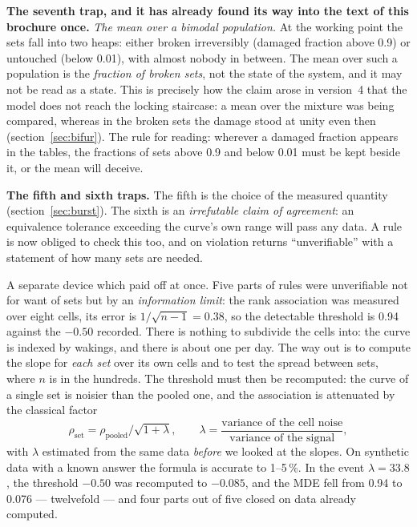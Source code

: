 \textbf{The seventh trap, and it has already found its way into the text of this brochure once.} \emph{The mean over a bimodal population.} At the working point the sets fall into two heaps: either broken irreversibly (damaged fraction above 0.9) or untouched (below 0.01), with almost nobody in between. The mean over such a population is the \emph{fraction of broken sets}, not the state of the system, and it may not be read as a state. This is precisely how the claim arose in version~4 that the model does not reach the locking staircase: a mean over the mixture was being compared, whereas in the broken sets the damage stood at unity even then (section~\ref{sec:bifur}). The rule for reading: wherever a damaged fraction appears in the tables, the fractions of sets above 0.9 and below 0.01 must be kept beside it, or the mean will deceive.

\textbf{The fifth and sixth traps.} The fifth is the choice of the measured quantity (section~\ref{sec:burst}). The sixth is an \emph{irrefutable claim of agreement}: an equivalence tolerance exceeding the curve's own range will pass any data. A rule is now obliged to check this too, and on violation returns ``unverifiable'' with a statement of how many sets are needed.

\begin{ineq}
A separate device which paid off at once. Five parts of rules were unverifiable not for want of sets but by an \emph{information limit}: the rank association was measured over eight cells, its error is $1/\sqrt{n-1}=0.38$, so the detectable threshold is 0.94 against the $-0.50$ recorded. There is nothing to subdivide the cells into: the curve is indexed by wakings, and there is about one per day. The way out is to compute the slope for \emph{each set} over its own cells and to test the spread between sets, where $n$ is in the hundreds. The threshold must then be recomputed: the curve of a single set is noisier than the pooled one, and the association is attenuated by the classical factor
\[\rho_{\text{set}}=\rho_{\text{pooled}}\big/\sqrt{1+\lambda},\qquad \lambda=\frac{\text{variance of the cell noise}}{\text{variance of the signal}},\]
with $\lambda$ estimated from the same data \emph{before} we looked at the slopes. On synthetic data with a known answer the formula is accurate to 1--5\,\%. In the event $\lambda=33.8$, the threshold $-0.50$ was recomputed to $-0.085$, and the MDE fell from 0.94 to 0.076 --- twelvefold --- and four parts out of five closed on data already computed.
\end{ineq}

